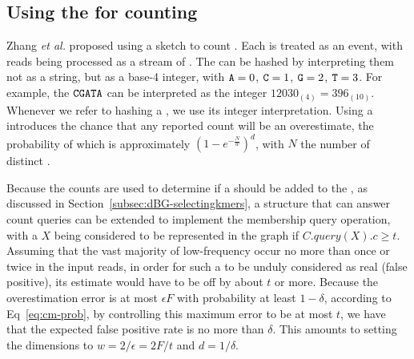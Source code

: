 \subsection{Using the \cm for counting }
\label{subsec:cm-countingkmers}

Zhang \emph{et al.} proposed using a \cm sketch to count  \cite{Zhang2014}. Each \kmer is treated as an event, with reads being processed as a stream of . The  can be hashed by interpreting them not as a string, but as a base-4 integer, with $\mathtt{A}=0$, $\mathtt{C}=1$, $\mathtt{G}=2$, $\mathtt{T}=3$. For example, the \kmer $\mathtt{C}\mathtt{G}\mathtt{A}\mathtt{T}\mathtt{A}$ can be interpreted as the integer $12030_{(4)} = 396_{(10)}$. Whenever we refer to hashing a \kmer, we use its integer interpretation. Using a \cm introduces the chance that any reported count will be an overestimate, the probability of which is approximately $(1-e^{-\frac{N}{w}})^d$, with $N$ the number of distinct  \cite{Zhang2014}.


Because the \kmer counts are used to determine if a \kmer should be added to the \dBG, as discussed in Section~\ref{subsec:dBG-selectingkmers}, a structure that can answer count queries can be extended to implement the membership query operation, with a \kmer $X$ being considered to be represented in the graph if $C.\mathit{query}(X).c \geq t$. 
Assuming that the vast majority of low-frequency \kmers occur no more than once or twice in the input reads, in order for such a \kmer to be unduly considered as real (false positive), its \cm estimate would have to be off by about $t$ or more. Because the \cm overestimation error is at most $\epsilon F$ with probability at least $1-\delta$, according to Eq~\ref{eq:cm-prob}, by controlling this maximum error to be at most $t$, we have that the expected false positive rate is no more than $\delta$. This amounts to setting the \cm dimensions to $w=2/\epsilon = 2F/t$ and $d=1/\delta$.




